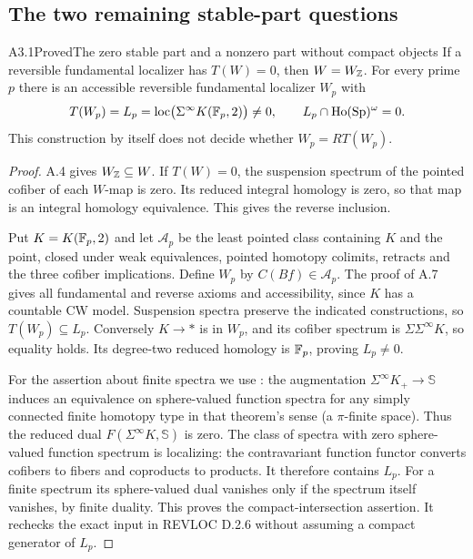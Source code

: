 \subsection{The two remaining stable-part questions}
\begin{claim}{A3.1}{Proved}{The zero stable part and a nonzero part without compact objects}\label{A31}
If a reversible fundamental localizer has $T(W)=0$, then $W=W_{\mathbb Z}$. For every prime $p$ there is an accessible reversible fundamental localizer $W_p$ with
\[
 T(W_p)=L_p=\operatorname{loc}\bigl(\Sigma^\infty K(\mathbb F_p,2)\bigr)\ne0,
 \qquad L_p\cap\mathrm{Ho}(\mathrm{Sp})^\omega=0.
\]
This construction by itself does not decide whether $W_p=RT(W_p)$.
\end{claim}
\begin{proof}
A.4 gives $W_{\mathbb Z}\subseteq W$. If $T(W)=0$, the suspension spectrum of the pointed cofiber of each $W$-map is zero. Its reduced integral homology is zero, so that map is an integral homology equivalence. This gives the reverse inclusion.

Put $K=K(\mathbb F_p,2)$ and let $\mathcal A_p$ be the least pointed class containing $K$ and the point, closed under weak equivalences, pointed homotopy colimits, retracts and the three cofiber implications. Define $W_p$ by $C(Bf)\in\mathcal A_p$. The proof of A.7 gives all fundamental and reverse axioms and accessibility, since $K$ has a countable CW model. Suspension spectra preserve the indicated constructions, so $T(W_p)\subseteq L_p$. Conversely $K\to *$ is in $W_p$, and its cofiber spectrum is $\Sigma\Sigma^\infty K$, so equality holds. Its degree-two reduced homology is $\mathbb F_p$, proving $L_p\ne0$.

For the assertion about finite spectra we use \cite[Corollary 1.4.1]{AAllenYuan}: the augmentation $\Sigma^\infty K_+\to\mathbb S$ induces an equivalence on sphere-valued function spectra for any simply connected finite homotopy type in that theorem's sense (a $\pi$-finite space). Thus the reduced dual $F(\Sigma^\infty K,\mathbb S)$ is zero. The class of spectra with zero sphere-valued function spectrum is localizing: the contravariant function functor converts cofibers to fibers and coproducts to products. It therefore contains $L_p$. For a finite spectrum its sphere-valued dual vanishes only if the spectrum itself vanishes, by finite duality. This proves the compact-intersection assertion. It rechecks the exact input in REVLOC D.2.6 without assuming a compact generator of $L_p$.
\end{proof}


